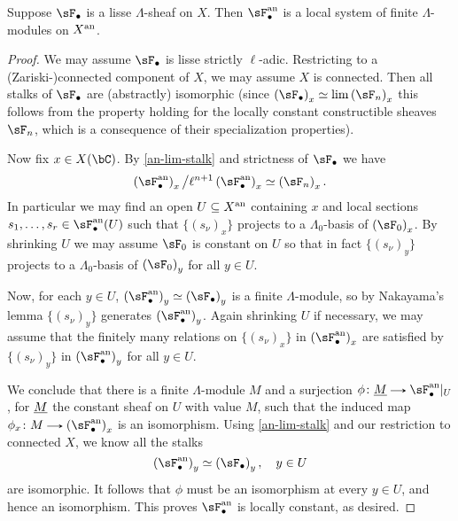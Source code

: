 \begin{corollary}
  \label{an-lisse-local}
  Suppose $\sF_\bullet$ is a lisse $\Lambda$-sheaf on $X$. Then $\sF_\bullet^\an$ is a local system of finite $\Lambda$-modules on $X^{\mathrm{an}}$.

  \begin{proof}
    We may assume $\sF_\bullet$ is lisse strictly $\ell$-adic. Restricting to a (Zariski-)connected component of $X$, we may assume $X$ is connected. Then all stalks of $\sF_\bullet$ are (abstractly) isomorphic (since $\l(\sF_\bullet\r)_x \iso \lim {\l(\sF_n\r)_x}$ this follows from the property holding for the locally constant constructible sheaves $\sF_n$, which is a consequence of their specialization properties).

    Now fix $x \in X(\bC)$. By \cref{an-lim-stalk} and strictness of $\sF_\bullet$ we have
    \[
      \l(\sF_\bullet^\an\r)_x \big/ \ell^{n+1} \l(\sF_\bullet^\an\r)_x \iso \l(\sF_n\r)_x.
    \]
    In particular we may find an open $U \subseteq X^{\mathrm{an}}$ containing $x$ and local sections $s_1,\ldots,s_r \in \sF_\bullet^\an(U)$ such that $\{(s_\nu)_x\}$ projects to a $\Lambda_0$-basis of $\l(\sF_0\r)_x$. By shrinking $U$ we may assume $\sF_0$ is constant on $U$ so that in fact $\{(s_\nu)_y\}$ projects to a $\Lambda_0$-basis of $\l(\sF_0\r)_y$ for all $y \in U$.

    Now, for each $y \in U$, $\l(\sF_\bullet^\an\r)_y \iso \l(\sF_\bullet\r)_y$ is a finite $\Lambda$-module, so by Nakayama's lemma $\{(s_\nu)_y\}$ generates $\l(\sF_\bullet^\an\r)_y$. Again shrinking $U$ if necessary, we may assume that the finitely many relations on $\{(s_\nu)_x\}$ in $\l(\sF_\bullet^\an\r)_x$ are satisfied by $\{(s_\nu)_y\}$ in $\l(\sF_\bullet^\an\r)_y$ for all $y \in U$.

    We conclude that there is a finite $\Lambda$-module $M$ and a surjection $\phi \c \u M \to \sF_\bullet^\an|_U$, for $\underline M$ the constant sheaf on $U$ with value $M$, such that the induced map $\phi_x \c M \to \l(\sF^\an_\bullet\r)_x$ is an isomorphism. Using \cref{an-lim-stalk} and our restriction to connected $X$, we know all the stalks
    \[
      \l(\sF_\bullet^\an\r)_y \iso \l(\sF_\bullet\r)_y, \quad y \in U
    \]
    are isomorphic. It follows that $\phi$ must be an isomorphism at every $y \in U$, and hence an isomorphism. This proves $\sF_\bullet^\an$ is locally constant, as desired.
  \end{proof}
\end{corollary}

